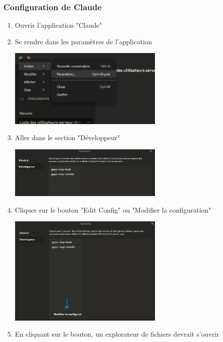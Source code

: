 \subsubsection*{Configuration de Claude}

\begin{enumerate}
    \item Ouvrir l'application "Claude"
    
    \item Se rendre dans les paramètres de l'application
    
    \includegraphics[width=0.6\textwidth]{../images/parametres-claude}
    
    \item Aller dans le section "Développeur"
    
    \includegraphics[width=0.6\textwidth]{../images/mode_developpeur-claude}
    
    \item Cliquer sur le bouton "Edit Config" ou "Modifier la configuration"
    
    \includegraphics[width=0.6\textwidth]{../images/modifier_configuration-claude}

    \item En cliquant sur le bouton, un explorateur de fichiers devrait s'ouvrir
    

\end{enumerate}
